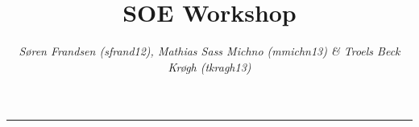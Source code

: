 %
%
%
%
%

\usepackage{etoolbox}
\makeatletter
\patchcmd{\chapter}{\if@openright\cleardoublepage\else\clearpage\fi}{}{}{}
\makeatother
\makeatletter
\newcommand*{\toccontents}{\@starttoc{toc}}
\makeatother

\patchcmd{\thebibliography}{\chapter*}{\section*}{}{}

\title{\HUGE\bfseries{SOE Workshop}}
\author{\textit{Søren Frandsen (sfrand12), Mathias Sass Michno (mmichn13) \& Troels Beck Krøgh (tkragh13)}}


{\let\newpage\relax\maketitle}
\begin{center}
\rule{0.7\textwidth}{1pt}
\end{center}
\toccontents
\vspace{-20pt}
\begingroup
%
%










\begin{appendices} 
    
\end{appendices}
\endgroup


